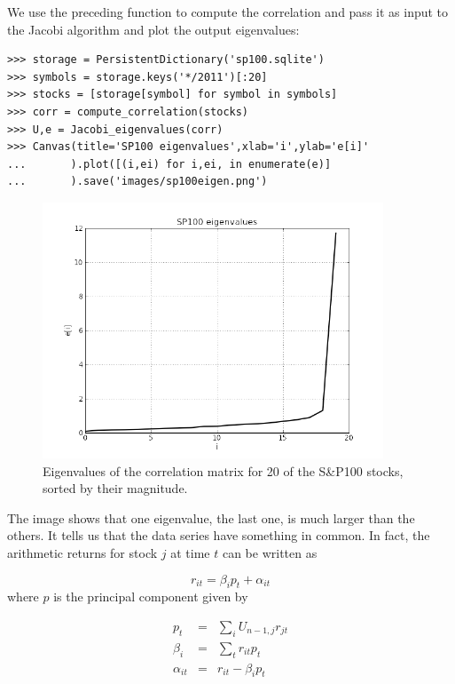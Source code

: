 \documentclass[justified,sixbynine]{tufte-book}
\def\ft{\small\tt}
\theoremstyle{plain}%
\theoremstyle{definition}
\theoremstyle{remark}
\begin{document}
\begin{fullwidth}
We use the preceding function to compute the correlation and pass it as input to the Jacobi algorithm and plot the output eigenvalues:

\begin{lstlisting}[caption={in file: {\ft nlib.py}}]
>>> storage = PersistentDictionary('sp100.sqlite')
>>> symbols = storage.keys('*/2011')[:20]
>>> stocks = [storage[symbol] for symbol in symbols]
>>> corr = compute_correlation(stocks)
>>> U,e = Jacobi_eigenvalues(corr)
>>> Canvas(title='SP100 eigenvalues',xlab='i',ylab='e[i]'
...       ).plot([(i,ei) for i,ei, in enumerate(e)]
...       ).save('images/sp100eigen.png')
\end{lstlisting}

\begin{figure}[ht]
\centering\includegraphics[width=4in]{images/sp100eigen.png}
\caption{Eigenvalues of the correlation matrix for 20 of the S\&P100 stocks, sorted by their magnitude.}
\end{figure}


The image shows that one eigenvalue, the last one, is much larger than the others. It tells us that the data series have something in common. In fact, the arithmetic returns for stock $j$ at time $t$ can be written as

\begin{equation}
r_{it} = \beta_i p_t + \alpha_{it}
\end{equation}
where $p$ is the principal component given by

\begin{eqnarray}
p_t &=& \sum_i U_{n-1,j} r_{jt} \\
\beta_i &=& \sum_t r_{it} p_t \\
\alpha_{it} &=& r_{it} - \beta_i p_t
\end{eqnarray}


\end{fullwidth}
\end{document}
